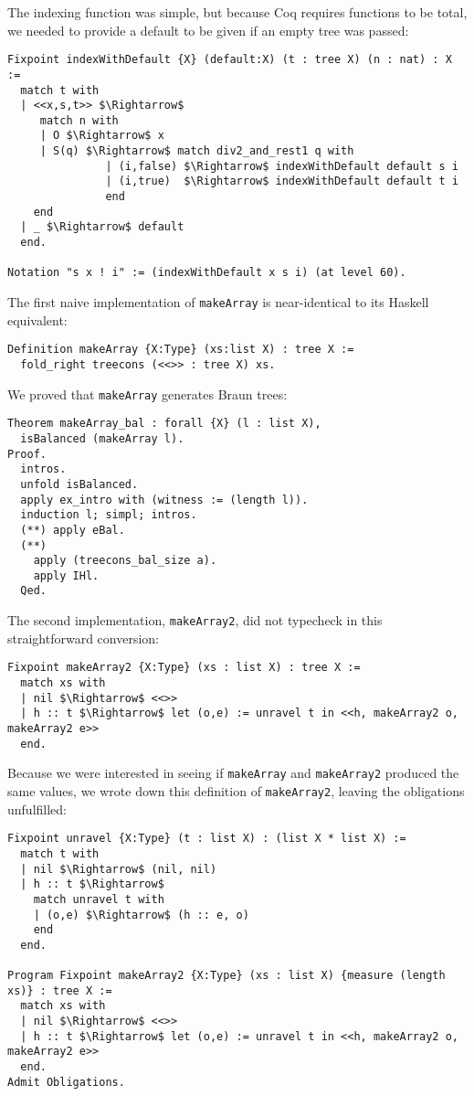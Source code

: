 \documentclass[a4paper,10pt]{article}
\begin{document}
The indexing function was simple, but because Coq requires functions to be total, we needed to provide a default to be given if an empty tree was passed:

\begin{lstlisting}[mathescape=true]
Fixpoint indexWithDefault {X} (default:X) (t : tree X) (n : nat) : X :=
  match t with
  | <<x,s,t>> $\Rightarrow$ 
     match n with
     | O $\Rightarrow$ x
     | S(q) $\Rightarrow$ match div2_and_rest1 q with
               | (i,false) $\Rightarrow$ indexWithDefault default s i
               | (i,true)  $\Rightarrow$ indexWithDefault default t i
               end
    end
  | _ $\Rightarrow$ default
  end.

Notation "s x ! i" := (indexWithDefault x s i) (at level 60).
\end{lstlisting}

The first naive implementation of \texttt{makeArray} is near-identical to its Haskell equivalent:

\begin{lstlisting}[mathescape=true]
Definition makeArray {X:Type} (xs:list X) : tree X :=
  fold_right treecons (<<>> : tree X) xs.
\end{lstlisting}

We proved that \texttt{makeArray} generates Braun trees:

\begin{lstlisting}[mathescape=true]
Theorem makeArray_bal : forall {X} (l : list X),
  isBalanced (makeArray l).
Proof.
  intros.
  unfold isBalanced. 
  apply ex_intro with (witness := (length l)).
  induction l; simpl; intros.
  (**) apply eBal.
  (**)
    apply (treecons_bal_size a).
    apply IHl.
  Qed.  
\end{lstlisting}

The second implementation, \texttt{makeArray2}, did not typecheck in this straightforward conversion:

\begin{lstlisting}[mathescape=true]
Fixpoint makeArray2 {X:Type} (xs : list X) : tree X :=
  match xs with
  | nil $\Rightarrow$ <<>>
  | h :: t $\Rightarrow$ let (o,e) := unravel t in <<h, makeArray2 o, makeArray2 e>>
  end.
\end{lstlisting}

Because we were interested in seeing if \texttt{makeArray} and \texttt{makeArray2} produced the same values, we wrote down this definition of \texttt{makeArray2}, leaving the obligations unfulfilled:

\begin{lstlisting}[mathescape=true]
Fixpoint unravel {X:Type} (t : list X) : (list X * list X) :=
  match t with
  | nil $\Rightarrow$ (nil, nil)
  | h :: t $\Rightarrow$ 
    match unravel t with
    | (o,e) $\Rightarrow$ (h :: e, o)
    end
  end.

Program Fixpoint makeArray2 {X:Type} (xs : list X) {measure (length xs)} : tree X :=
  match xs with
  | nil $\Rightarrow$ <<>>
  | h :: t $\Rightarrow$ let (o,e) := unravel t in <<h, makeArray2 o, makeArray2 e>>
  end.
Admit Obligations.
\end{lstlisting}
\end{document}
